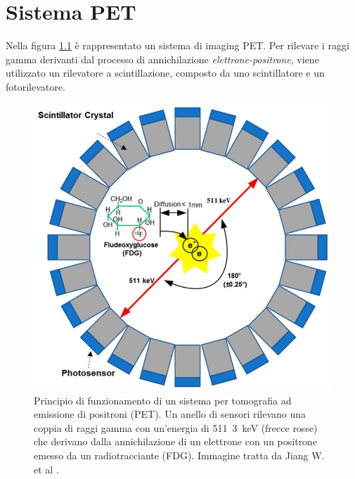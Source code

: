 \chapter{Sistema PET}
Nella figura \ref{fig:PET_imaging_system} è rappresentato un sistema di imaging PET. Per rilevare i raggi gamma derivanti dal processo di annichilazione \textit{elettrone-positrone}, viene utilizzato un rilevatore a scintillazione, composto da uno scintillatore e un fotorilevatore. 
\begin{figure}[h]
	\centering
	\includegraphics[width=0.5\linewidth]{./ImageFiles/PET_imaging_system}
	\caption{Principio di funzionamento di un sistema per tomografia ad emissione di positroni (PET). Un anello di sensori rilevano una coppia di raggi gamma con un'energia di \SI{511}{3\kilo\electronvolt} (frecce rosse) che derivano dalla annichilazione di un elettrone con un positrone emesso da un radiotracciante (FDG). Immagine tratta da Jiang W. et al \cite{Jiang2019}.}
	\label{fig:PET_imaging_system}
\end{figure}

